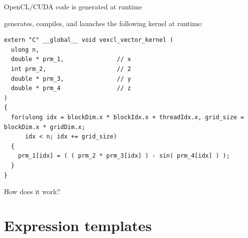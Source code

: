 \documentclass[@BEAMER_OPTIONS@]{beamer}
\begin{document}
\begin{frame}[fragile]{OpenCL/CUDA code is generated at runtime}
\begin{exampleblock}{generates, compiles, and launches the following kernel
        at runtime:}
\begin{onlyenv}
            \begin{lstlisting}
extern "C" __global__ void vexcl_vector_kernel (
  ulong n,
  double * prm_1,               // x
  int prm_2,                    // 2
  double * prm_3,               // y
  double * prm_4                // z
)
{
  for(ulong idx = blockDim.x * blockIdx.x + threadIdx.x, grid_size = blockDim.x * gridDim.x;
      idx < n; idx += grid_size)
  {
    prm_1[idx] = ( ( prm_2 * prm_3[idx] ) - sin( prm_4[idx] ) );
  }
}
            \end{lstlisting}
        \end{onlyenv}
    \end{exampleblock}
\end{frame}

\note{ }

\begin{frame}
    \begin{center}
        \huge{How does it work?}
    \end{center}
\end{frame}

\note{ }

\section{Expression templates}
\begin{frame}
    \sectionpage
\end{frame}

\note{}
\end{document}
